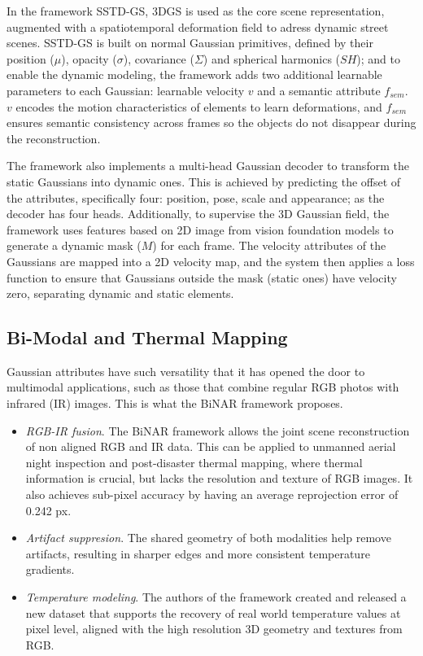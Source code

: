 \documentclass[
	a4paper, %
	10pt, %
	unnumberedsections, %
	twoside, %
]{LTJournalArticle}
\begin{document}
In the framework SSTD-GS, 3DGS is used as the core scene representation, augmented with a spatiotemporal deformation field to adress dynamic street scenes. SSTD-GS is built on normal Gaussian primitives, defined by their position ($\mu$), opacity ($\sigma$), covariance ($\Sigma$) and spherical harmonics ($SH$); and to enable the dynamic modeling, the framework adds two additional learnable parameters to each Gaussian: learnable velocity $v$ and a semantic attribute $f_{sem}$. $v$ encodes the motion characteristics of elements to learn deformations, and $f_{sem}$ ensures semantic consistency across frames so the objects do not disappear during the reconstruction.

The framework also implements a multi-head Gaussian decoder to transform the static Gaussians into dynamic ones. This is achieved by predicting the offset of the attributes, specifically four: position, pose, scale and appearance; as the decoder has four heads. Additionally, to supervise the 3D Gaussian field, the framework uses features based on 2D image from vision foundation models to generate a dynamic mask ($M$) for each frame. The velocity attributes of the Gaussians are mapped into a 2D velocity map, and the system then applies a loss function to ensure that Gaussians outside the mask (static ones) have velocity zero, separating dynamic and static elements.

\subsection{Bi-Modal and Thermal Mapping}

Gaussian attributes have such versatility that it has opened the door to multimodal applications, such as those that combine regular RGB photos with infrared (IR) images. This is what the BiNAR \cite{binar2026} framework proposes.
\begin{itemize}
	\item \textit{RGB-IR fusion}. The BiNAR framework allows the joint scene reconstruction of non aligned RGB and IR data. This can be applied to unmanned aerial night inspection and post-disaster thermal mapping, where thermal information is crucial, but lacks the resolution and texture of RGB images. It also achieves sub-pixel accuracy by having an average reprojection error of 0.242 px.
	\item \textit{Artifact suppresion}. The shared geometry of both modalities help remove artifacts, resulting in sharper edges and more consistent temperature gradients.
	\item \textit{Temperature modeling}. The authors of the framework created and released a new dataset that supports the recovery of real world temperature values at pixel level, aligned with the high resolution 3D geometry and textures from RGB.
\end{itemize}
\end{document}
